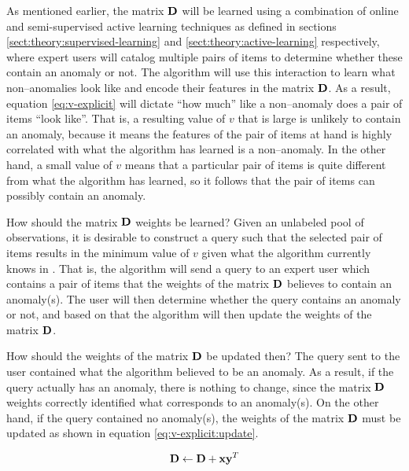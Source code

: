 As mentioned earlier, the matrix $\boldsymbol{\mathbf{D}}$ will be learned using a combination of online and semi-supervised active learning techniques as defined in sections \ref{sect:theory:supervised-learning} and \ref{sect:theory:active-learning} respectively, where expert users will catalog multiple pairs of items to determine whether these contain an anomaly or not. The \mlblink algorithm will use this interaction to learn what non--anomalies look like and encode their features in the matrix $\boldsymbol{\mathbf{D}}$. As a result, equation \ref{eq:v-explicit} will dictate ``how much'' like a non--anomaly does a pair of items ``look like''. That is, a resulting value of $v$ that is large is unlikely to contain an anomaly, because it means the features of the pair of items at hand is highly correlated with what the \mlblink algorithm has learned is a non--anomaly. In the other hand, a small value of $v$ means that a particular pair of items is quite different from what the \mlblink algorithm has learned, so it follows that the pair of items can possibly contain an anomaly.  \newline

How should the matrix $\boldsymbol{\mathbf{D}}$ weights be learned? Given an unlabeled pool of observations, it is desirable to construct a query such that the selected pair of items results in the minimum value of $v$ given what the \mlblink algorithm currently knows in . That is, the \mlblink algorithm will send a query to an expert user which contains a pair of items that the weights of the matrix $\boldsymbol{\mathbf{D}}$ believes to contain an anomaly(s). The user will then determine whether the query contains an anomaly or not, and based on that the \mlblink algorithm will then update the weights of the matrix $\boldsymbol{\mathbf{D}}$.  \newline

How should the weights of the matrix $\boldsymbol{\mathbf{D}}$ be updated then? The query sent to the user contained what the \mlblink algorithm believed to be an anomaly. As a result, if the query actually has an anomaly, there is nothing to change, since the matrix $\boldsymbol{\mathbf{D}}$ weights correctly identified what corresponds to an anomaly(s). On the other hand, if the query contained no anomaly(s), the weights of the matrix $\boldsymbol{\mathbf{D}}$ must be updated as shown in equation \ref{eq:v-explicit:update}.

\begin{equation} \label{eq:v-explicit:update}
  \boldsymbol{\mathbf{D}} \gets \boldsymbol{\mathbf{D}} + \boldsymbol{\mathbf{x}} \boldsymbol{\mathbf{y}}^T  
\end{equation}